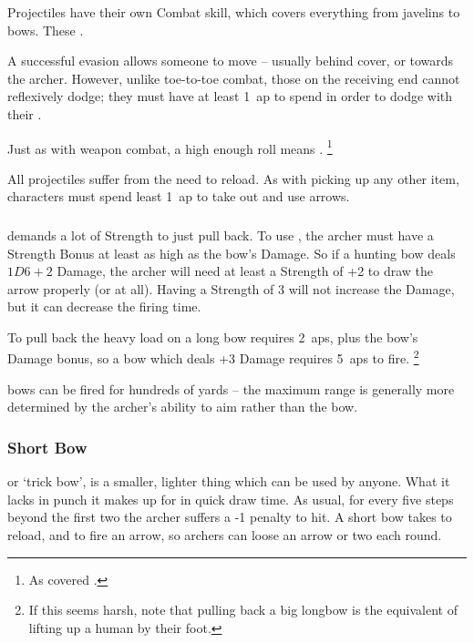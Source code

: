 \begin{multicols}{2}

\noindent
Projectiles have their own Combat \gls{skill}, which covers everything from javelins to bows.
These .

A successful evasion allows someone to move -- usually behind cover, or towards the archer.
However, unlike toe-to-toe combat, those on the receiving end cannot reflexively dodge; they must have at least 1~\gls{ap} to spend in order to dodge with their .

Just as with weapon combat, a high enough roll means .
\footnote{As covered .}

All projectiles suffer from the need to reload.
As with picking up any other item, characters must spend least 1~\gls{ap} to take out and use arrows.

\subsubsection{}
\label{longbow}
demands a lot of Strength to just pull back.
To use , the archer must have a Strength Bonus at least as high as the bow's Damage.
So if a hunting bow deals $1D6+2$ Damage, the archer will need at least a Strength of +2 to draw the arrow properly (or at all).
Having a Strength of 3 will not increase the Damage, but it can decrease the firing time.

To pull back the heavy load on a long bow requires 2~\glspl{ap}, plus the bow's Damage bonus, so a bow which deals +3 Damage requires 5~\glspl{ap} to fire.%
\footnote{If this seems harsh, note that pulling back a big longbow is the equivalent of lifting up a human by their foot.}

\Glspl{bow} can be fired for hundreds of yards -- the maximum range is generally more determined by the archer's ability to aim rather than the bow.

\subsubsection{Short Bow}
or `trick bow', is a smaller, lighter thing which can be used by anyone.
What it lacks in punch it makes up for in quick draw time.
As usual, for every five steps beyond the first two the archer suffers a -1 penalty to hit.
A short bow takes  to reload, and  to fire an arrow, so archers can loose an arrow or two each round.


\end{multicols}
